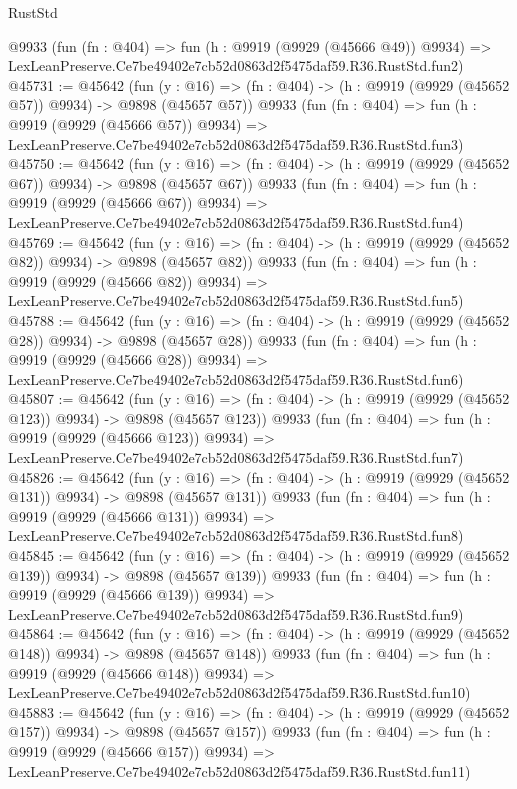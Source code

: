 \begin{lexlean}{RustStd}
\begin{coremodule}
    @9933
    (fun (fn : @404) =>
    fun (h : @9919 (@9929 (@45666 @49)) @9934) =>
    LexLeanPreserve.Ce7be49402e7cb52d0863d2f5475daf59.R36.RustStd.fun2)
@45731 := @45642
    (fun (y : @16) => (fn : @404) -> (h : @9919 (@9929 (@45652 @57)) @9934) -> @9898 (@45657 @57))
    @9933
    (fun (fn : @404) =>
    fun (h : @9919 (@9929 (@45666 @57)) @9934) =>
    LexLeanPreserve.Ce7be49402e7cb52d0863d2f5475daf59.R36.RustStd.fun3)
@45750 := @45642
    (fun (y : @16) => (fn : @404) -> (h : @9919 (@9929 (@45652 @67)) @9934) -> @9898 (@45657 @67))
    @9933
    (fun (fn : @404) =>
    fun (h : @9919 (@9929 (@45666 @67)) @9934) =>
    LexLeanPreserve.Ce7be49402e7cb52d0863d2f5475daf59.R36.RustStd.fun4)
@45769 := @45642
    (fun (y : @16) => (fn : @404) -> (h : @9919 (@9929 (@45652 @82)) @9934) -> @9898 (@45657 @82))
    @9933
    (fun (fn : @404) =>
    fun (h : @9919 (@9929 (@45666 @82)) @9934) =>
    LexLeanPreserve.Ce7be49402e7cb52d0863d2f5475daf59.R36.RustStd.fun5)
@45788 := @45642
    (fun (y : @16) => (fn : @404) -> (h : @9919 (@9929 (@45652 @28)) @9934) -> @9898 (@45657 @28))
    @9933
    (fun (fn : @404) =>
    fun (h : @9919 (@9929 (@45666 @28)) @9934) =>
    LexLeanPreserve.Ce7be49402e7cb52d0863d2f5475daf59.R36.RustStd.fun6)
@45807 := @45642
    (fun (y : @16) => (fn : @404) -> (h : @9919 (@9929 (@45652 @123)) @9934) -> @9898 (@45657 @123))
    @9933
    (fun (fn : @404) =>
    fun (h : @9919 (@9929 (@45666 @123)) @9934) =>
    LexLeanPreserve.Ce7be49402e7cb52d0863d2f5475daf59.R36.RustStd.fun7)
@45826 := @45642
    (fun (y : @16) => (fn : @404) -> (h : @9919 (@9929 (@45652 @131)) @9934) -> @9898 (@45657 @131))
    @9933
    (fun (fn : @404) =>
    fun (h : @9919 (@9929 (@45666 @131)) @9934) =>
    LexLeanPreserve.Ce7be49402e7cb52d0863d2f5475daf59.R36.RustStd.fun8)
@45845 := @45642
    (fun (y : @16) => (fn : @404) -> (h : @9919 (@9929 (@45652 @139)) @9934) -> @9898 (@45657 @139))
    @9933
    (fun (fn : @404) =>
    fun (h : @9919 (@9929 (@45666 @139)) @9934) =>
    LexLeanPreserve.Ce7be49402e7cb52d0863d2f5475daf59.R36.RustStd.fun9)
@45864 := @45642
    (fun (y : @16) => (fn : @404) -> (h : @9919 (@9929 (@45652 @148)) @9934) -> @9898 (@45657 @148))
    @9933
    (fun (fn : @404) =>
    fun (h : @9919 (@9929 (@45666 @148)) @9934) =>
    LexLeanPreserve.Ce7be49402e7cb52d0863d2f5475daf59.R36.RustStd.fun10)
@45883 := @45642
    (fun (y : @16) => (fn : @404) -> (h : @9919 (@9929 (@45652 @157)) @9934) -> @9898 (@45657 @157))
    @9933
    (fun (fn : @404) =>
    fun (h : @9919 (@9929 (@45666 @157)) @9934) =>
    LexLeanPreserve.Ce7be49402e7cb52d0863d2f5475daf59.R36.RustStd.fun11)

\end{coremodule}
\end{lexlean}
